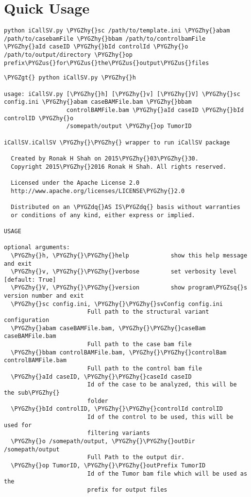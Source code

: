\documentclass[letterpaper,10pt,english]{sphinxmanual}
\def\PYGZus{\char`\_}
\def\PYGZgt{\char`\>}
\def\PYGZhy{\char`\-}
\def\PYGZsq{\char`\'}
\def\PYGZdq{\char`\"}
\renewcommand\PYGZsq{\textquotesingle}
\begin{document}
\section{Quick Usage}
\label{iCallSV:quick-usage}
\begin{Verbatim}[commandchars=\\\{\}]
python iCallSV.py \PYGZhy{}sc /path/to/template.ini \PYGZhy{}abam /path/to/casebamFile \PYGZhy{}bbam /path/to/controlbamFile \PYGZhy{}aId caseID \PYGZhy{}bId controlId \PYGZhy{}o /path/to/output/directory \PYGZhy{}op prefix\PYGZus{}for\PYGZus{}the\PYGZus{}output\PYGZus{}files
\end{Verbatim}

\begin{Verbatim}[commandchars=\\\{\}]
\PYGZgt{} python iCallSV.py \PYGZhy{}h

usage: iCallSV.py [\PYGZhy{}h] [\PYGZhy{}v] [\PYGZhy{}V] \PYGZhy{}sc config.ini \PYGZhy{}abam caseBAMFile.bam \PYGZhy{}bbam
                  controlBAMFile.bam \PYGZhy{}aId caseID \PYGZhy{}bId controlID \PYGZhy{}o
                  /somepath/output \PYGZhy{}op TumorID

iCallSV.iCallSV \PYGZhy{}\PYGZhy{} wrapper to run iCallSV package

  Created by Ronak H Shah on 2015\PYGZhy{}03\PYGZhy{}30.
  Copyright 2015\PYGZhy{}2016 Ronak H Shah. All rights reserved.

  Licensed under the Apache License 2.0
  http://www.apache.org/licenses/LICENSE\PYGZhy{}2.0

  Distributed on an \PYGZdq{}AS IS\PYGZdq{} basis without warranties
  or conditions of any kind, either express or implied.

USAGE

optional arguments:
  \PYGZhy{}h, \PYGZhy{}\PYGZhy{}help            show this help message and exit
  \PYGZhy{}v, \PYGZhy{}\PYGZhy{}verbose         set verbosity level [default: True]
  \PYGZhy{}V, \PYGZhy{}\PYGZhy{}version         show program\PYGZsq{}s version number and exit
  \PYGZhy{}sc config.ini, \PYGZhy{}\PYGZhy{}svConfig config.ini
                        Full path to the structural variant configuration
  \PYGZhy{}abam caseBAMFile.bam, \PYGZhy{}\PYGZhy{}caseBam caseBAMFile.bam
                        Full path to the case bam file
  \PYGZhy{}bbam controlBAMFile.bam, \PYGZhy{}\PYGZhy{}controlBam controlBAMFile.bam
                        Full path to the control bam file
  \PYGZhy{}aId caseID, \PYGZhy{}\PYGZhy{}caseId caseID
                        Id of the case to be analyzed, this will be the sub\PYGZhy{}
                        folder
  \PYGZhy{}bId controlID, \PYGZhy{}\PYGZhy{}controlId controlID
                        Id of the control to be used, this will be used for
                        filtering variants
  \PYGZhy{}o /somepath/output, \PYGZhy{}\PYGZhy{}outDir /somepath/output
                        Full Path to the output dir.
  \PYGZhy{}op TumorID, \PYGZhy{}\PYGZhy{}outPrefix TumorID
                        Id of the Tumor bam file which will be used as the
                        prefix for output files
\end{Verbatim}
\end{document}
